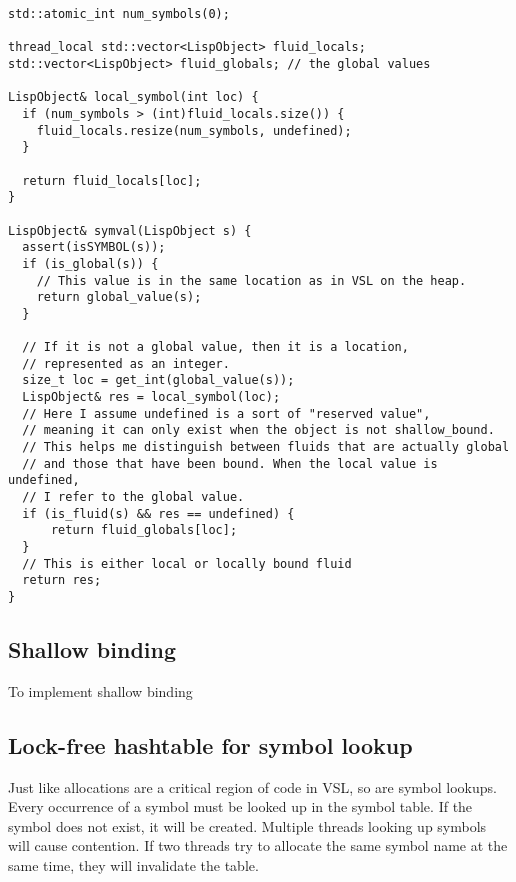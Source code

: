 \begin{verbatim}
std::atomic_int num_symbols(0);

thread_local std::vector<LispObject> fluid_locals;
std::vector<LispObject> fluid_globals; // the global values

LispObject& local_symbol(int loc) {
  if (num_symbols > (int)fluid_locals.size()) {
    fluid_locals.resize(num_symbols, undefined);
  }

  return fluid_locals[loc];
}

LispObject& symval(LispObject s) {
  assert(isSYMBOL(s));
  if (is_global(s)) {
    // This value is in the same location as in VSL on the heap.
    return global_value(s);
  }

  // If it is not a global value, then it is a location,
  // represented as an integer.
  size_t loc = get_int(global_value(s));
  LispObject& res = local_symbol(loc);
  // Here I assume undefined is a sort of "reserved value",
  // meaning it can only exist when the object is not shallow_bound.
  // This helps me distinguish between fluids that are actually global
  // and those that have been bound. When the local value is undefined,
  // I refer to the global value.
  if (is_fluid(s) && res == undefined) {
      return fluid_globals[loc];
  }
  // This is either local or locally bound fluid
  return res;
}
\end{verbatim}

\subsection{Shallow binding}
\label{sec:shallow}

To implement shallow binding

\subsection{Lock-free hashtable for symbol lookup}
\label{sec:hashtable}
Just like allocations are a critical region of code in VSL, so are symbol lookups.
Every occurrence of a symbol must be looked up in the symbol table. If the symbol does
not exist, it will be created. Multiple threads looking up symbols will cause contention.
If two threads try to allocate the same symbol name at the same time, they will invalidate
the table.

